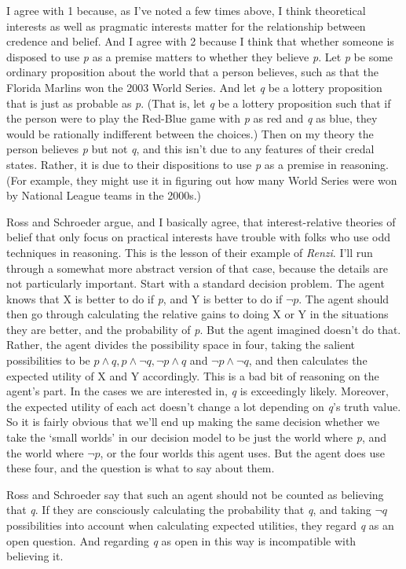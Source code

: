 \documentclass[11pt,]{book}
\begin{document}
I agree with 1 because, as I've noted a few times above, I think theoretical interests as well as pragmatic interests matter for the relationship between credence and belief. And I agree with 2 because I think that whether someone is disposed to use \emph{p} as a premise matters to whether they believe \emph{p}. Let \emph{p} be some ordinary proposition about the world that a person believes, such as that the Florida Marlins won the 2003 World Series. And let \emph{q} be a lottery proposition that is just as probable as \emph{p}. (That is, let \emph{q} be a lottery proposition such that if the person were to play the Red-Blue game with \emph{p} as red and \emph{q} as blue, they would be rationally indifferent between the choices.) Then on my theory the person believes \emph{p} but not \emph{q}, and this isn't due to any features of their credal states. Rather, it is due to their dispositions to use \emph{p} as a premise in reasoning. (For example, they might use it in figuring out how many World Series were won by National League teams in the 2000s.)

Ross and Schroeder argue, and I basically agree, that interest-relative theories of belief that only focus on practical interests have trouble with folks who use odd techniques in reasoning. This is the lesson of their example of \emph{Renzi}. I'll run through a somewhat more abstract version of that case, because the details are not particularly important. Start with a standard decision problem. The agent knows that X is better to do if \emph{p}, and Y is better to do if \(\neg p\). The agent should then go through calculating the relative gains to doing X or Y in the situations they are better, and the probability of \emph{p}. But the agent imagined doesn't do that. Rather, the agent divides the possibility space in four, taking the salient possibilities to be
\(p \wedge q, p \wedge \neg q, \neg p \wedge q\) and \(\neg p \wedge \neg q\), and then calculates the expected utility of X and Y accordingly. This is a bad bit of reasoning on the agent's part. In the cases we are interested in, \emph{q} is exceedingly likely. Moreover, the expected utility of each act doesn't change a lot depending on \emph{q}'s truth value. So it is fairly obvious that we'll end up making the same decision whether we take the `small worlds' in our decision model to be just the world where \emph{p}, and the world where \(\neg p\), or the four worlds this agent uses. But the agent does use these four, and the question is what to say about them.

Ross and Schroeder say that such an agent should not be counted as believing that \emph{q}. If they are consciously calculating the probability that \emph{q}, and taking \(\neg q\) possibilities into account when calculating expected utilities, they regard \emph{q} as an open question. And regarding \emph{q} as open in this way is incompatible with believing it.
\end{document}
